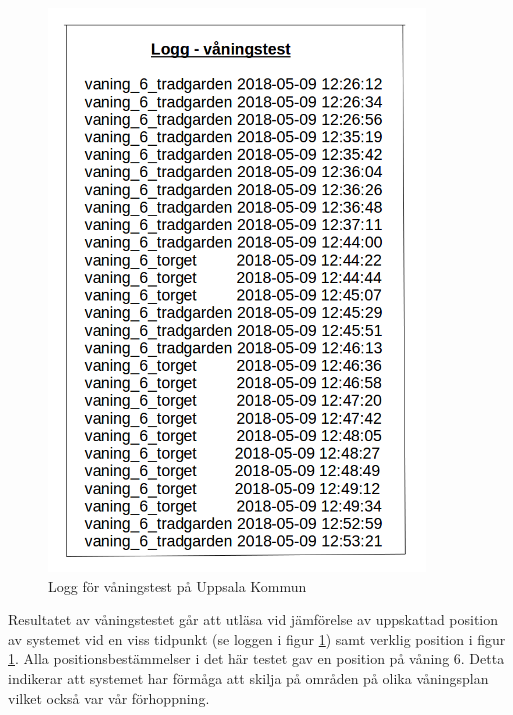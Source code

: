 \documentclass[a4paper,12pt]{article}
\begin{document}
 \begin{figure}[H]
   \centering
   \includegraphics[width=10cm]{media/logg_vaningstest.png}
   \caption{Logg för våningstest på Uppsala Kommun}
   \label{fig:logg_vaningstest}
 \end{figure}

 Resultatet av våningstestet går att utläsa vid jämförelse av uppskattad position av systemet vid en viss tidpunkt (se loggen i figur \ref{fig:logg_vaningstest}) samt verklig position i figur \ref{fig:logg_vaningstest}. Alla positionsbestämmelser i det här testet gav en position på våning 6. Detta indikerar att systemet har förmåga att skilja på områden på olika våningsplan vilket också var vår förhoppning.
\end{document}
